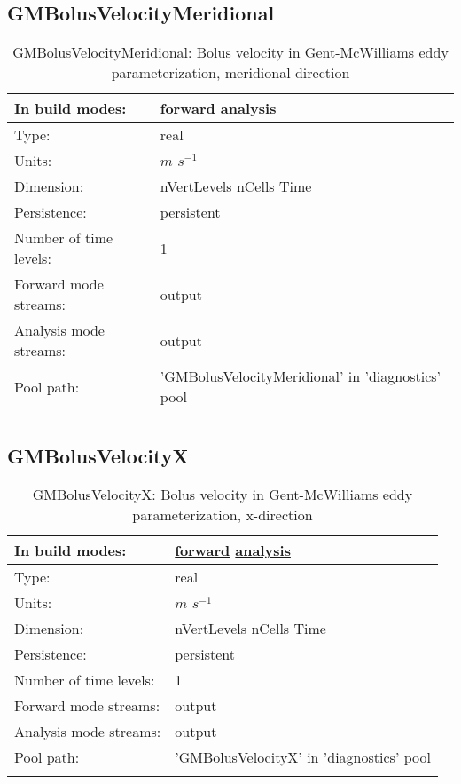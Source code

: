 \subsection[GMBolusVelocityMeridional]{GMBolusVelocityMeridional}
\label{subsec:var_sec_diagnostics_GMBolusVelocityMeridional}
\begin{center}
\begin{longtable}{| p{2.0in} | p{4.0in} |}
        \hline 
        In build modes: & \hyperref[subsec:forward_var_tab_diagnostics]{forward} \hyperref[subsec:analysis_var_tab_diagnostics]{analysis} \\
        \hline 
        Type: & real \\
        \hline 
        Units: & $m$ $s^{-1}$ \\
        \hline 
        Dimension: & nVertLevels nCells Time \\
        \hline 
        Persistence: & persistent \\
        \hline 
        Number of time levels: & 1 \\
        \hline 
		 Forward mode streams: &  output \\
        \hline 
		 Analysis mode streams: &  output \\
        \hline 
            Pool path: & 'GMBolusVelocityMeridional' in 'diagnostics' pool
 \\
		 \hline 
    \caption{GMBolusVelocityMeridional: Bolus velocity in Gent-McWilliams eddy parameterization, meridional-direction}
\end{longtable}
\end{center}
\subsection[GMBolusVelocityX]{GMBolusVelocityX}
\label{subsec:var_sec_diagnostics_GMBolusVelocityX}
\begin{center}
\begin{longtable}{| p{2.0in} | p{4.0in} |}
        \hline 
        In build modes: & \hyperref[subsec:forward_var_tab_diagnostics]{forward} \hyperref[subsec:analysis_var_tab_diagnostics]{analysis} \\
        \hline 
        Type: & real \\
        \hline 
        Units: & $m$ $s^{-1}$ \\
        \hline 
        Dimension: & nVertLevels nCells Time \\
        \hline 
        Persistence: & persistent \\
        \hline 
        Number of time levels: & 1 \\
        \hline 
		 Forward mode streams: &  output \\
        \hline 
		 Analysis mode streams: &  output \\
        \hline 
            Pool path: & 'GMBolusVelocityX' in 'diagnostics' pool
 \\
		 \hline 
    \caption{GMBolusVelocityX: Bolus velocity in Gent-McWilliams eddy parameterization, x-direction}
\end{longtable}
\end{center}

